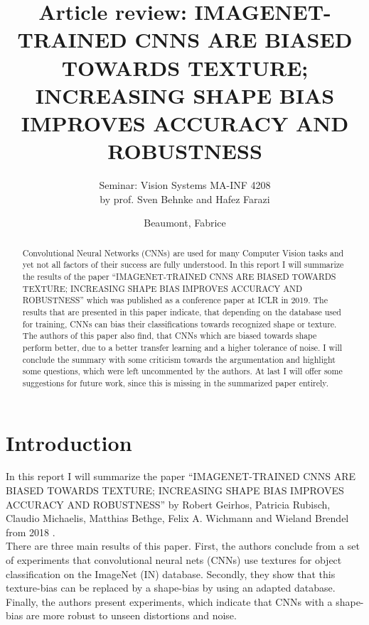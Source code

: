 \documentclass[runningheads,a4paper]{llncs}
\begin{document}
%
\frontmatter          %
%
\pagestyle{headings}  %
%
\mainmatter              %
%
\title{Article review: IMAGENET-TRAINED CNNS ARE BIASED TOWARDS TEXTURE; INCREASING SHAPE BIAS IMPROVES ACCURACY AND ROBUSTNESS}
\subtitle{Seminar: Vision Systems MA-INF 4208 \\by prof. Sven Behnke and Hafez Farazi}
%
%
\author{Beaumont, Fabrice}
%

\maketitle              %

\begin{abstract}
	Convolutional Neural Networks (CNNs) are used for many Computer Vision tasks and yet not all factors of their success are fully understood. In this report I will summarize the results of the paper ``IMAGENET-TRAINED CNNS ARE BIASED TOWARDS TEXTURE; INCREASING SHAPE BIAS IMPROVES ACCURACY AND ROBUSTNESS'' \citep{geirhos2018imagenet} which was published as a conference paper at ICLR in 2019. The results that are presented in this paper indicate, that depending on the database used for training, CNNs can bias their classifications towards recognized shape or texture. The authors of this paper also find, that CNNs which are biased towards shape perform better, due to a better transfer learning and a higher tolerance of noise. I will conclude the summary with some criticism towards the argumentation and highlight some questions, which were left uncommented by the authors. At last I will offer some suggestions for future work, since this is missing in the summarized paper entirely.
\end{abstract}

\section{Introduction}

In this report I will summarize the paper ``IMAGENET-TRAINED CNNS ARE BIASED TOWARDS TEXTURE; INCREASING SHAPE BIAS IMPROVES ACCURACY AND ROBUSTNESS'' by Robert Geirhos, Patricia Rubisch, Claudio Michaelis, Matthias Bethge, Felix A. Wichmann and Wieland Brendel from 2018 \citep{geirhos2018imagenet}. \\
There are three main results of this paper. 
First, the authors conclude from a set of experiments that convolutional neural nets (CNNs) use textures for object classification on the ImageNet (IN) database. Secondly, they show that this texture-bias can be replaced by a shape-bias by using an adapted database. Finally, the authors present experiments, which indicate that CNNs with a shape-bias are more robust to unseen distortions and noise.\\
\end{document}

